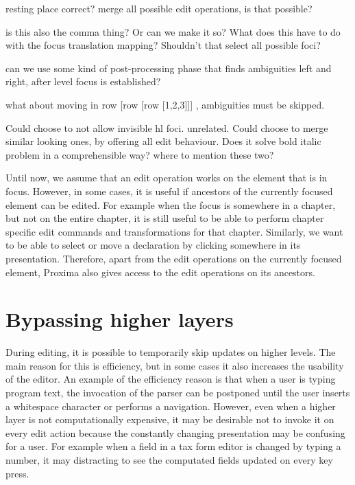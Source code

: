 \bc
resting place correct?
merge all possible edit operations, is that possible?

is this also the comma thing? Or can we make it so?
What does this have to do with the focus translation mapping? Shouldn't that select all possible foci?

can we use some kind of post-processing phase that finds ambiguities left and right, after level focus is established?

what about moving in row [row [row [1,2,3]]] , ambiguities must be skipped. 

Could choose to not allow invisible hl foci. unrelated.
Could choose to merge similar looking ones, by offering all edit behaviour. Does it solve bold italic problem in a comprehensible way?
where to mention these two?
\ec

Until now, we assume that an edit operation works on the element that is in focus. However, in some cases, it is useful if ancestors of the currently focused element can be edited. For example when the focus is somewhere in a chapter, but not on the entire chapter, it is still useful to be able to perform chapter specific edit commands and transformations for that chapter. Similarly, we want to be able to select or move a declaration by clicking somewhere in its presentation. Therefore, apart from the edit operations on the currently focused element, Proxima also gives access to the edit operations on its ancestors. 


%																
%																
%																
\section{Bypassing higher layers} \label{sect:bypassingLayers}

During editing, it is possible to temporarily skip updates on higher levels. The main reason for this is efficiency, but in some cases it also increases the usability of the editor. An example of the efficiency reason is that when a user is typing program text, the invocation of the parser can be postponed until the user inserts a whitespace character or performs a navigation. However, even when a higher layer is not computationally expensive, it may be desirable not to invoke it on every edit action because the constantly changing presentation may be confusing for a user. For example when a field in a tax form editor is changed by typing a number, it may distracting to see the computated fields updated on every key press.

